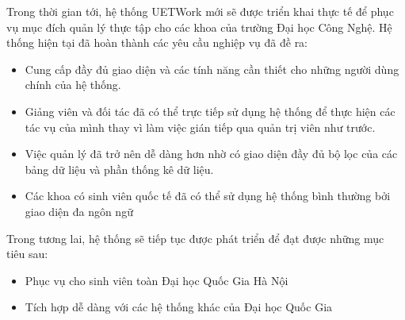 \documentclass[./../main.tex]{subfiles}
\begin{document}
Trong thời gian tới, hệ thống UETWork mới sẽ được triển khai thực tế để phục vụ mục đích quản lý thực tập cho các khoa của trường Đại học Công Nghệ. Hệ thống hiện tại đã hoàn thành các yêu cầu nghiệp vụ đã đề ra:
\begin{itemize}
	\item Cung cấp đầy đủ giao diện và các tính năng cần thiết cho những người dùng chính của hệ thống.
	\item Giảng viên và đối tác đã có thể trực tiếp sử dụng hệ thống để thực hiện các tác vụ của mình thay vì làm việc gián tiếp qua quản trị viên như trước.
	\item Việc quản lý đã trở nên dễ dàng hơn nhờ có giao diện đầy đủ bộ lọc của các bảng dữ liệu và phần thống kê dữ liệu.
	\item Các khoa có sinh viên quốc tế đã có thể sử dụng hệ thống bình thường bởi giao diện đa ngôn ngữ
\end{itemize}

Trong tương lai, hệ thống sẽ tiếp tục được phát triển để đạt được những mục tiêu sau:
\begin{itemize}
	\item Phục vụ cho sinh viên toàn Đại học Quốc Gia Hà Nội
	\item Tích hợp dễ dàng với các hệ thống khác của Đại học Quốc Gia
\end{itemize}
\end{document}
